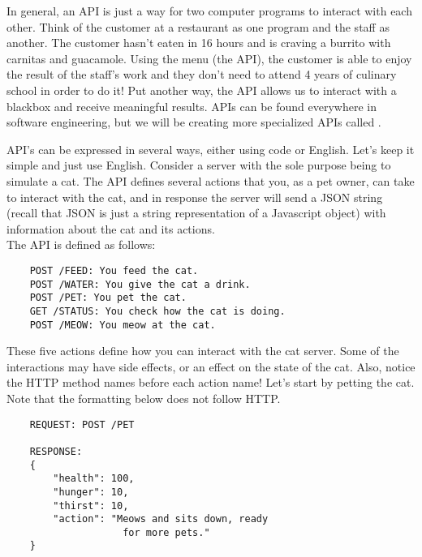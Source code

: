 In general, an API is just a way for two computer programs to interact with each other. Think of the customer at a restaurant as one program and the staff as another. The customer hasn't eaten in 16 hours and is craving a burrito with carnitas and guacamole. Using the menu (the API), the customer is able to enjoy the result of the staff's work and they don't need to attend 4 years of culinary school in order to do it! Put another way, the API allows us to interact with a blackbox and receive meaningful results. APIs can be found everywhere in software engineering, but we will be creating more specialized APIs called .

\begin{kaobox}[title=Let's take a look at an example of a simple API.]
    
    API's can be expressed in several ways, either using code or English. Let's keep it simple and just use English. Consider a server with the sole purpose being to simulate a cat. The API defines several actions that you, as a pet owner, can take to interact with the cat, and in response the server will send a JSON string (recall that JSON is just a string representation of a Javascript object) with information about the cat and its actions. \\

    The API is defined as follows:
    \begin{verbatim}
    POST /FEED: You feed the cat.
    POST /WATER: You give the cat a drink.
    POST /PET: You pet the cat.
    GET /STATUS: You check how the cat is doing.
    POST /MEOW: You meow at the cat.
    \end{verbatim}

    These five actions define how you can interact with the cat server. Some of the interactions may have side effects, or an effect on the state of the cat. Also, notice the HTTP method names before each action name! Let's start by petting the cat. Note that the formatting below does not follow HTTP.

    \begin{verbatim}
    REQUEST: POST /PET

    RESPONSE: 
    {
        "health": 100,
        "hunger": 10,
        "thirst": 10,
        "action": "Meows and sits down, ready 
                    for more pets."
    }
    \end{verbatim}


\end{kaobox}

